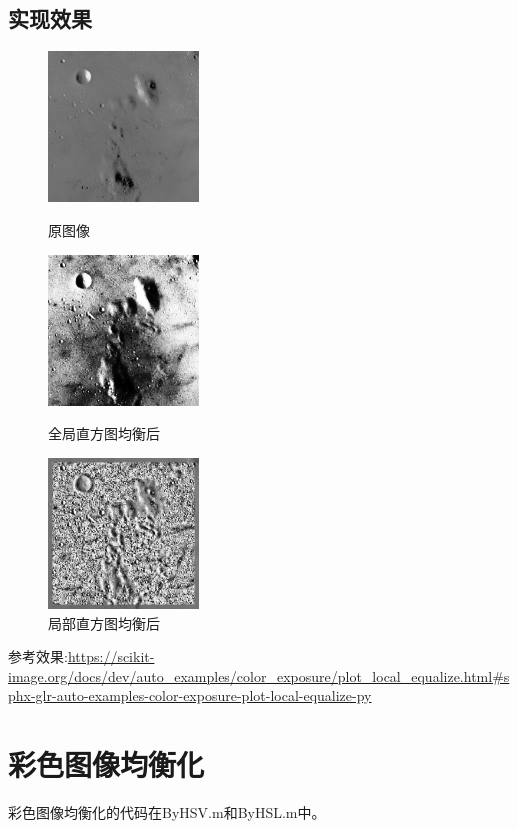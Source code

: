 \documentclass[11pt, a4paper, UTF8]{ctexart}
\begin{document}
\subsection{实现效果}

\begin{figure}[H]
  \centering
  \begin{minipage}[t]{0.3\textwidth}
  \centering
  \includegraphics[width=4cm]{gray_moon.jpg}
  \caption{原图像}
  \end{minipage}
  \begin{minipage}[t]{0.3\textwidth}
    \centering
    \includegraphics[width=4cm]{gray_moon_global_converted.jpg}
    \caption{全局直方图均衡后}
    \end{minipage}
  \begin{minipage}[t]{0.3\textwidth}
  \centering
  \includegraphics[width=4cm]{gray_moon_local_converted.jpg}
  \caption{局部直方图均衡后}
  \end{minipage}
\end{figure}

参考效果:\url{https://scikit-image.org/docs/dev/auto_examples/color_exposure/plot_local_equalize.html#sphx-glr-auto-examples-color-exposure-plot-local-equalize-py}



\section{彩色图像均衡化}
彩色图像均衡化的代码在ByHSV.m和ByHSL.m中。
\end{document}
